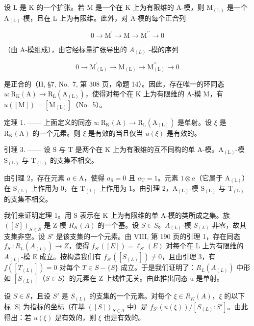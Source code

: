 设 \(\mathrm{L}\) 是 \(\mathrm{K}\) 的一个扩张。若 \(\mathrm{M}\) 是一个在 \(\mathrm{K}\) 上为有限维的 A-模，则 \(\mathrm{M}_{(\mathrm{L})}\) 是一个 \(\mathrm{A}_{(\mathrm{L})}\)-模，且在 \(\mathrm{L}\) 上为有限维。此外，对 A-模的每个正合列

\[
0 \longrightarrow \mathrm{M} ^ {\prime} \longrightarrow \mathrm{M} \longrightarrow \mathrm{M} ^ {\prime \prime} \longrightarrow 0
\]

（由 A-模组成），由它经标量扩张导出的 \(A_{(L)}\) -模的序列

\[
0 \longrightarrow \mathrm{M} _ {(\mathrm{L})} ^ {\prime} \longrightarrow \mathrm{M} _ {(\mathrm{L})} \longrightarrow \mathrm{M} _ {(\mathrm{L})} ^ {\prime \prime} \longrightarrow 0
\]

是正合的（II, §7, No.~7, 第 308 页，命题 14）。因此，存在唯一的环同态 \(u: \mathrm{R}_{\mathrm{K}}(\mathrm{A}) \to \mathrm{R}_{\mathrm{L}}(\mathrm{A}_{(\mathrm{L})})\)，使得对每个在 K 上为有限维的 A-模 M，有 \(u([\mathrm{M}]) = [\mathrm{M}_{(\mathrm{L})}]\)（No.~5）。

定理 1. —— 上面定义的同态 \(u: \mathrm{R}_{\mathrm{K}}(\mathrm{A}) \to \mathrm{R}_{\mathrm{L}}(\mathrm{A}_{(\mathrm{L})})\) 是单射。设 \(\xi\) 是 \(\mathrm{R}_{\mathrm{K}}(\mathrm{A})\) 的一个元素。则 \(\xi\) 是有效的当且仅当 \(u(\xi)\) 是有效的。

引理 3. —— 设 S 与 T 是两个在 K 上为有限维的互不同构的单 A-模。\(\mathrm{A}_{(\mathrm{L})}\)-模 \(\mathrm{S}_{(\mathrm{L})}\) 与 \(\mathrm{T}_{(\mathrm{L})}\) 的支集不相交。

由引理 2，存在元素 \(a \in \mathrm{A}\)，使得 \(a_{\mathrm{S}} = 0\) 且 \(a_{\mathrm{T}} = 1\)。元素 \(1 \otimes a\)（它属于 \(\mathrm{A}_{(\mathrm{L})}\)）在 \(\mathrm{S}_{(\mathrm{L})}\) 上作用为 0，在 \(\mathrm{T}_{(\mathrm{L})}\) 上作用为 1。由引理 2，\(\mathrm{A}_{(\mathrm{L})}\)-模 \(\mathrm{S}_{(\mathrm{L})}\) 与 \(\mathrm{T}_{(\mathrm{L})}\) 的支集不相交。

我们来证明定理 1。用 S 表示在 K 上为有限维的单 A-模的类所成之集。族 \(([S])_{S \in \mathcal{S}}\) 是 Z-模 \(R_{K}(A)\) 的一个基。设 \(S \in S\)。\(A_{(L)}\)-模 \(S_{(L)}\) 非零，故其支集非空。设 \(S'\) 是该支集的一个元素。由 VIII, 第 190 页的引理 1，存在同态 \(f_{S'} : R_L(A_{(L)}) \to Z\)，使得 \(f_{S'}([E]) = \ell_{S'}(E)\) 对每个在 L 上为有限维的 \(A_{(L)}\)-模 E 成立。按构造我们有 \(f_{S'}([S_{(L)}]) \neq 0\)，且由引理 3，有 \(f([T_{(L)}]) = 0\) 对每个 \(T \in S - \{S\}\) 成立。于是我们证明了：\(R_L(A_{(L)})\) 中形如 \([S_{(L)}]\)（\(S \in S\)）的元素在 Z 上线性无关。由此推出同态 u 是单射。

设 \(S \in \mathscr{S}\)，且设 \(S'\) 是 \(S_{(L)}\) 的支集的一个元素。对每个 \(\xi \in R_K(A)\)，\(\xi\) 的以下标 {[}S{]} 为指标的坐标（在基 \(([S])_{S \in \mathscr{S}}\) 中）是 \(f_{S'}(u(\xi)) / [S_{(L)} : S']\)。由此得出：若 \(u(\xi)\) 是有效的，则 \(\xi\) 也是有效的。

